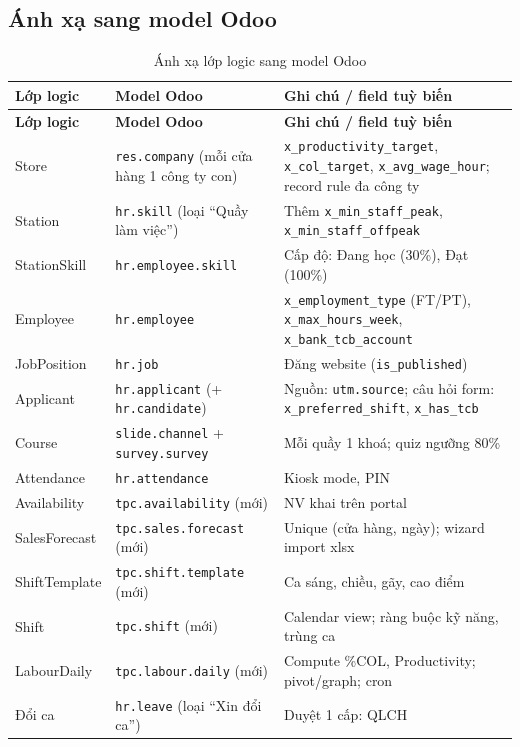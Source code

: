 \documentclass[12pt,a4paper,oneside]{report}
\begin{document}
\subsection{Ánh xạ sang model Odoo}
\begin{longtable}{L{3.2cm}L{4.4cm}L{6.8cm}}
\caption{Ánh xạ lớp logic sang model Odoo}\label{tab:map}\\
\toprule \textbf{Lớp logic} & \textbf{Model Odoo} & \textbf{Ghi chú / field tuỳ biến} \\\midrule\endfirsthead
\toprule \textbf{Lớp logic} & \textbf{Model Odoo} & \textbf{Ghi chú / field tuỳ biến} \\\midrule\endhead
Store & \texttt{res.company} (mỗi cửa hàng 1 công ty con) & \texttt{x\_productivity\_target}, \texttt{x\_col\_target}, \texttt{x\_avg\_wage\_hour}; record rule đa công ty \\
Station & \texttt{hr.skill} (loại ``Quầy làm việc'') & Thêm \texttt{x\_min\_staff\_peak}, \texttt{x\_min\_staff\_offpeak} \\
StationSkill & \texttt{hr.employee.skill} & Cấp độ: Đang học (30\%), Đạt (100\%) \\
Employee & \texttt{hr.employee} & \texttt{x\_employment\_type} (FT/PT), \texttt{x\_max\_hours\_week}, \texttt{x\_bank\_tcb\_account} \\
JobPosition & \texttt{hr.job} & Đăng website (\texttt{is\_published}) \\
Applicant & \texttt{hr.applicant} (+ \texttt{hr.candidate}) & Nguồn: \texttt{utm.source}; câu hỏi form: \texttt{x\_preferred\_shift}, \texttt{x\_has\_tcb} \\
Course & \texttt{slide.channel} + \texttt{survey.survey} & Mỗi quầy 1 khoá; quiz ngưỡng 80\% \\
Attendance & \texttt{hr.attendance} & Kiosk mode, PIN \\
Availability & \texttt{tpc.availability} (mới) & NV khai trên portal \\
SalesForecast & \texttt{tpc.sales.forecast} (mới) & Unique (cửa hàng, ngày); wizard import xlsx \\
ShiftTemplate & \texttt{tpc.shift.template} (mới) & Ca sáng, chiều, gãy, cao điểm \\
Shift & \texttt{tpc.shift} (mới) & Calendar view; ràng buộc kỹ năng, trùng ca \\
LabourDaily & \texttt{tpc.labour.daily} (mới) & Compute \%COL, Productivity; pivot/graph; cron \\
Đổi ca & \texttt{hr.leave} (loại ``Xin đổi ca'') & Duyệt 1 cấp: QLCH \\
\bottomrule
\end{longtable}
\end{document}

